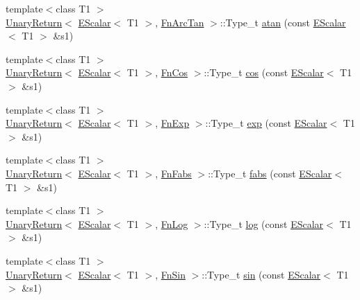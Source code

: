 \begin{DoxyCompactItemize}
\item 
{\footnotesize template$<$class T1 $>$ }\\\mbox{\hyperlink{structENSEM_1_1UnaryReturn}{Unary\+Return}}$<$ \mbox{\hyperlink{classENSEM_1_1EScalar}{E\+Scalar}}$<$ T1 $>$, \mbox{\hyperlink{structENSEM_1_1FnArcTan}{Fn\+Arc\+Tan}} $>$\+::Type\+\_\+t \mbox{\hyperlink{group__escalar_ga3169598490417ab5713660967ec6b658}{atan}} (const \mbox{\hyperlink{classENSEM_1_1EScalar}{E\+Scalar}}$<$ T1 $>$ \&s1)
\item 
{\footnotesize template$<$class T1 $>$ }\\\mbox{\hyperlink{structENSEM_1_1UnaryReturn}{Unary\+Return}}$<$ \mbox{\hyperlink{classENSEM_1_1EScalar}{E\+Scalar}}$<$ T1 $>$, \mbox{\hyperlink{structENSEM_1_1FnCos}{Fn\+Cos}} $>$\+::Type\+\_\+t \mbox{\hyperlink{group__escalar_ga841db2f3f6d6a553733b1b75a638f052}{cos}} (const \mbox{\hyperlink{classENSEM_1_1EScalar}{E\+Scalar}}$<$ T1 $>$ \&s1)
\item 
{\footnotesize template$<$class T1 $>$ }\\\mbox{\hyperlink{structENSEM_1_1UnaryReturn}{Unary\+Return}}$<$ \mbox{\hyperlink{classENSEM_1_1EScalar}{E\+Scalar}}$<$ T1 $>$, \mbox{\hyperlink{structENSEM_1_1FnExp}{Fn\+Exp}} $>$\+::Type\+\_\+t \mbox{\hyperlink{group__escalar_ga80b6028648c4f7d8f84f04d129bfa976}{exp}} (const \mbox{\hyperlink{classENSEM_1_1EScalar}{E\+Scalar}}$<$ T1 $>$ \&s1)
\item 
{\footnotesize template$<$class T1 $>$ }\\\mbox{\hyperlink{structENSEM_1_1UnaryReturn}{Unary\+Return}}$<$ \mbox{\hyperlink{classENSEM_1_1EScalar}{E\+Scalar}}$<$ T1 $>$, \mbox{\hyperlink{structENSEM_1_1FnFabs}{Fn\+Fabs}} $>$\+::Type\+\_\+t \mbox{\hyperlink{group__escalar_ga60eef052054b1a7da3e16a844de7d565}{fabs}} (const \mbox{\hyperlink{classENSEM_1_1EScalar}{E\+Scalar}}$<$ T1 $>$ \&s1)
\item 
{\footnotesize template$<$class T1 $>$ }\\\mbox{\hyperlink{structENSEM_1_1UnaryReturn}{Unary\+Return}}$<$ \mbox{\hyperlink{classENSEM_1_1EScalar}{E\+Scalar}}$<$ T1 $>$, \mbox{\hyperlink{structENSEM_1_1FnLog}{Fn\+Log}} $>$\+::Type\+\_\+t \mbox{\hyperlink{group__escalar_gabe969a92b7a6a506a417bb17fdf68b4c}{log}} (const \mbox{\hyperlink{classENSEM_1_1EScalar}{E\+Scalar}}$<$ T1 $>$ \&s1)
\item 
{\footnotesize template$<$class T1 $>$ }\\\mbox{\hyperlink{structENSEM_1_1UnaryReturn}{Unary\+Return}}$<$ \mbox{\hyperlink{classENSEM_1_1EScalar}{E\+Scalar}}$<$ T1 $>$, \mbox{\hyperlink{structENSEM_1_1FnSin}{Fn\+Sin}} $>$\+::Type\+\_\+t \mbox{\hyperlink{group__escalar_ga373122acba11edfbe0eff82093788afe}{sin}} (const \mbox{\hyperlink{classENSEM_1_1EScalar}{E\+Scalar}}$<$ T1 $>$ \&s1)

\end{DoxyCompactItemize}

